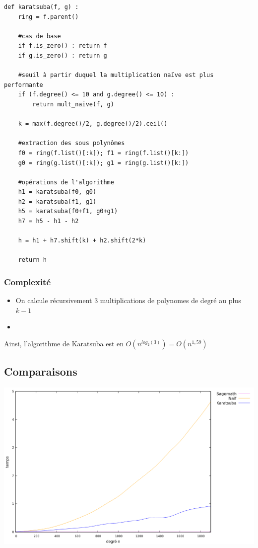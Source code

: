 \documentclass[a4paper]{article}
\begin{document}
\begin{lstlisting}[title={Karatsuba}]
def karatsuba(f, g) :
    ring = f.parent()

    #cas de base
    if f.is_zero() : return f
    if g.is_zero() : return g
    
    #seuil à partir duquel la multiplication naïve est plus performante
    if (f.degree() <= 10 and g.degree() <= 10) : 
        return mult_naive(f, g)

    k = max(f.degree()/2, g.degree()/2).ceil()

    #extraction des sous polynômes
    f0 = ring(f.list()[:k]); f1 = ring(f.list()[k:])
    g0 = ring(g.list()[:k]); g1 = ring(g.list()[k:])

    #opérations de l'algorithme
    h1 = karatsuba(f0, g0)
    h2 = karatsuba(f1, g1)
    h5 = karatsuba(f0+f1, g0+g1)
    h7 = h5 - h1 - h2

    h = h1 + h7.shift(k) + h2.shift(2*k)

    return h
\end{lstlisting}

\subsubsection*{Complexité}
\begin{itemize}
    \item On calcule récursivement 3 multiplications de polynomes de degré au plus $k-1$
    \item 
\end{itemize}
Ainsi, l'algorithme de Karatsuba est en $O(n^{log_2(3)}) = O(n^{1,59})$

\subsection{Comparaisons}

\includegraphics[scale=0.5, center]{multi.png}
\end{document}
